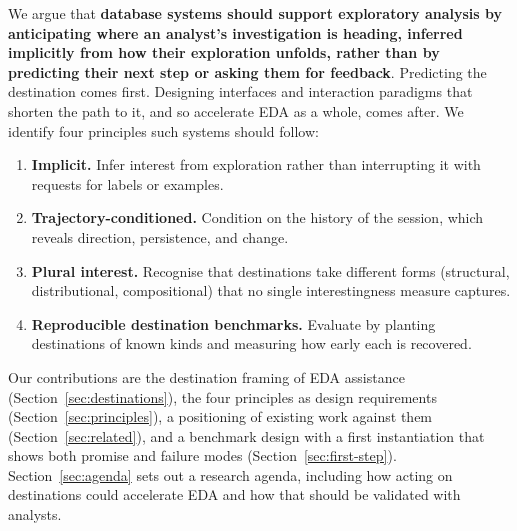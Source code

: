 \documentclass[sigconf]{acmart}
\begin{document}
We argue that \textbf{database systems should support exploratory analysis by anticipating where an analyst's investigation is heading, inferred implicitly from how their exploration unfolds, rather than by predicting their next step or asking them for feedback}. Predicting the destination comes first. Designing interfaces and interaction paradigms that shorten the path to it, and so accelerate EDA as a whole, comes after. We identify four principles such systems should follow:
\begin{enumerate}[leftmargin=1.4em, topsep=2pt, itemsep=1pt]
  \item \textbf{Implicit.} Infer interest from exploration rather than interrupting it with requests for labels or examples.
  \item \textbf{Trajectory-conditioned.} Condition on the history of the session, which reveals direction, persistence, and change.
  \item \textbf{Plural interest.} Recognise that destinations take different forms (structural, distributional, compositional) that no single interestingness measure captures.
  \item \textbf{Reproducible destination benchmarks.} Evaluate by planting destinations of known kinds and measuring how early each is recovered.
\end{enumerate}

Our contributions are the destination framing of EDA assistance (Section~\ref{sec:destinations}), the four principles as design requirements (Section~\ref{sec:principles}), a positioning of existing work against them (Section~\ref{sec:related}), and a benchmark design with a first instantiation that shows both promise and failure modes (Section~\ref{sec:first-step}). Section~\ref{sec:agenda} sets out a research agenda, including how acting on destinations could accelerate EDA and how that should be validated with analysts.


\end{document}
